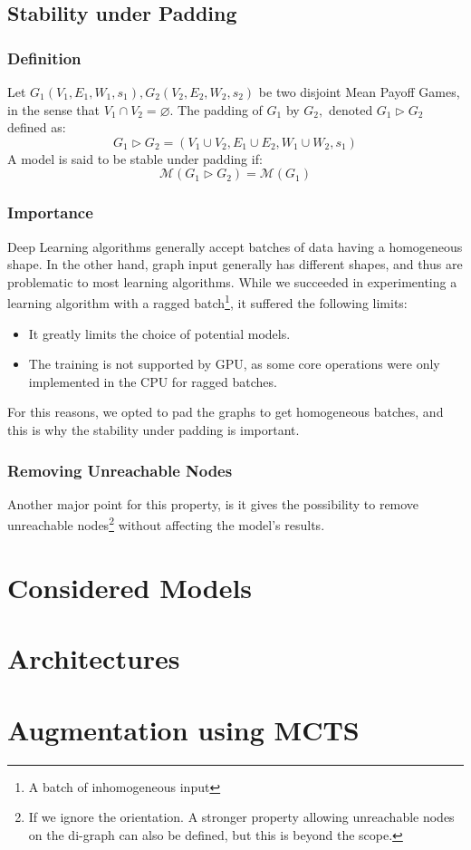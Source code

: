 \subsection{Stability under Padding}
\subsubsection{Definition}
Let $G_1(V_1,E_1,W_1,s_1),G_2(V_2,E_2,W_2,s_2)$ be two disjoint Mean Payoff Games, in the sense that $V_1\cap V_2=\varnothing.$
\newline The padding of $G_1$ by $G_2,$ denoted $G_1\rhd G_2$ defined as:
$$
G_1\rhd G_2=(V_1\cup V_2,E_1\cup E_2,W_1\cup W_2,s_1)
$$
A model is said to be stable under padding if:
$$
\mathcal{M}(G_1\rhd G_2)=\mathcal{M}(G_1)
$$
\subsubsection{Importance}
Deep Learning algorithms generally accept batches of data having a homogeneous shape.
\newline In the other hand, graph input generally has different shapes, and thus are problematic to most learning algorithms.
\newline While we succeeded in experimenting a learning algorithm with a ragged batch\footnote{A batch of inhomogeneous input}, it suffered the following limits:
\begin{itemize}
	\item It greatly limits the choice of potential models. 
	\item The training is not supported by GPU, as some core operations were only implemented in the CPU for ragged batches.
\end{itemize}
For this reasons, we opted to pad the graphs to get homogeneous batches, and this is why the stability under padding is important.
\subsubsection{Removing Unreachable Nodes}
Another major point for this property, is it gives the possibility to remove unreachable nodes\footnote{If we ignore the orientation. A stronger property allowing unreachable nodes on the di-graph can also be defined, but this is beyond the scope.} without affecting the model's results.

\section{Considered Models}

\section{Architectures}
\section{Augmentation using MCTS}